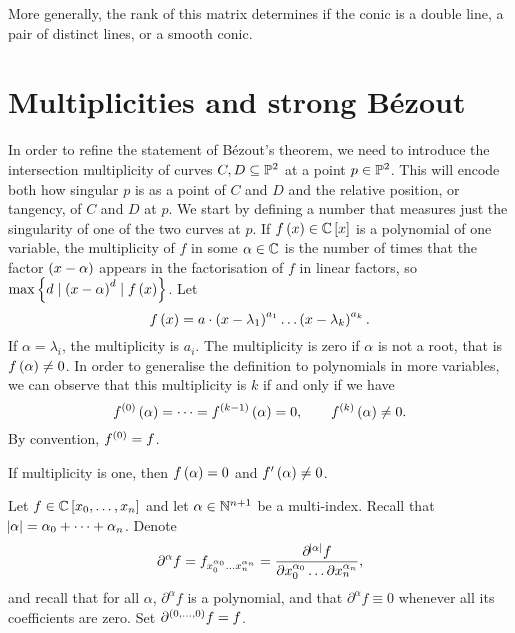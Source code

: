 More generally, the rank of this matrix determines if the conic is a double line, a pair of distinct lines, or a smooth conic.

\pagebreak

\section{Multiplicities and strong B\'ezout}

In order to refine the statement of B\'ezout's theorem, we need to introduce the intersection multiplicity of curves $ C, D \subseteq \P^2 $ at a point $ p \in \P^2 $. This will encode both how singular $ p $ is as a point of $ C $ and $ D $ and the relative position, or tangency, of $ C $ and $ D $ at $ p $. We start by defining a number that measures just the singularity of one of the two curves at $ p $. If $ f\br{x} \in \C\sbr{x} $ is a polynomial of one variable, the multiplicity of $ f $ in some $ \alpha \in \C $ is the number of times that the factor $ \br{x - \alpha} $ appears in the factorisation of $ f $ in linear factors, so $ \max\cbr{d \mid \br{x - \alpha}^d \mid f\br{x}} $. Let
$$ f\br{x} = a \cdot \br{x - \lambda_1}^{a_1} \dots \br{x - \lambda_k}^{a_k}. $$
If $ \alpha = \lambda_i $, the multiplicity is $ a_i $. The multiplicity is zero if $ \alpha $ is not a root, that is $ f\br{\alpha} \ne 0 $. In order to generalise the definition to polynomials in more variables, we can observe that this multiplicity is $ k $ if and only if we have
$$ f^{\br{0}}\br{\alpha} = \dots = f^{\br{k - 1}}\br{\alpha} = 0, \qquad f^{\br{k}}\br{\alpha} \ne 0. $$
By convention, $ f^{\br{0}} = f $.

\begin{example*}
If multiplicity is one, then $ f\br{\alpha} = 0 $ and $ f'\br{\alpha} \ne 0 $.
\end{example*}

\begin{notation}
Let $ f \in \C\sbr{x_0, \dots, x_n} $ and let $ \alpha \in \N^{n + 1} $ be a multi-index. Recall that $ \abs{\alpha} = \alpha_0 + \dots + \alpha_n $. Denote
$$ \partial^\alpha f = f_{x_0^{\alpha_0} \dots x_n^{\alpha_n}} = \dfrac{\partial^{\abs{\alpha}} f}{\partial x_0^{\alpha_0} \dots \partial x_n^{\alpha_n}}, $$
and recall that for all $ \alpha $, $ \partial^\alpha f $ is a polynomial, and that $ \partial^\alpha f \equiv 0 $ whenever all its coefficients are zero. Set $ \partial^{\br{0, \dots, 0}} f = f $.
\end{notation}

